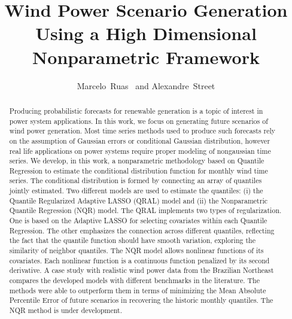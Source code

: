 \documentclass[journal]{IEEEtran}
\begin{document}
\title{Wind Power Scenario Generation Using a High Dimensional Nonparametric Framework}

\author{Marcelo~Ruas~%
	and Alexandre~Street%
	
	
}

\maketitle


\begin{abstract}
	Producing probabilistic forecasts for renewable generation is a topic of interest in power system applications. In this work, we focus on generating future scenarios of wind power generation.  Most time series methods used to produce such forecasts rely on the assumption of Gaussian errors or conditional Gaussian distribution, however real life applications on power systems require proper modeling of nongaussian time series.  
	We develop, in this work, a nonparametric methodology based on Quantile Regression to estimate the conditional distribution function for monthly wind time series.  
	The conditional distribution is formed by connecting an array of quantiles jointly estimated. 
	Two different models are used to estimate the quantiles: (i) the Quantile Regularized Adaptive LASSO (QRAL) model and (ii) the Nonparametric Quantile Regression (NQR) model.
	The QRAL implements two types of regularization. One is based on the Adaptive LASSO for selecting covariates within each Quantile Regression. The other emphasizes the connection across different quantiles, reflecting the fact that the quantile function should have smooth variation,
exploring the similarity of neighbor quantiles. The NQR model allows nonlinear functions of its covariates. Each nonlinear function is a continuous function penalized by its second derivative.
	A case study with realistic wind power data from the Brazilian Northeast compares the developed models with different benchmarks in the literature. The methods were able to outperform them in terms of minimizing the Mean Absolute Percentile Error of future scenarios in recovering the historic monthly quantiles. The NQR method is under development.
\end{abstract}
\end{document}
